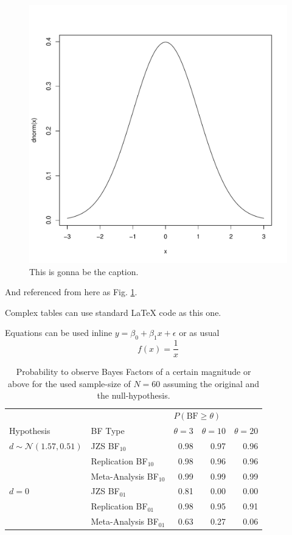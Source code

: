 \documentclass[fleqn,10pt]{wlscirep}
\begin{document}
\begin{figure}
\centering
\includegraphics{pics/dummy.pdf}
\caption{This is gonna be the caption.\label{fig:dummy}}
\end{figure}

And referenced from here as Fig. \ref{fig:dummy}.

Complex tables can use standard LaTeX code as this one.

Equations can be used inline \(y=\beta_0 + \beta_1 x + \epsilon\) or as
usual \[f(x)=\frac{1}{x}\]

\begin{table}[ht]
\centering
\caption{Probability to observe Bayes Factors of a certain magnitude or above for the used sample-size of $N=60$ assuming the original and the null-hypothesis.}
\begin{tabular}{llrrr}
  & & \multicolumn{3}{l}{$P(\text{BF}\ge\theta)$}\\
  Hypothesis & BF Type & $\theta=3$ & $\theta=10$ & $\theta=20$ \\
  \hline
  $d\sim \mathcal{N}(1.57, 0.51)$ & JZS BF$_{10}$ & 0.98 & 0.97 & 0.96 \\
     & Replication BF$_{10}$ & 0.98 & 0.96 & 0.96 \\
     & Meta-Analysis BF$_{10}$ & 0.99 & 0.99 & 0.99 \\\cline{2-5}
    $d=0$ & JZS BF$_{01}$ & 0.81 & 0.00 & 0.00 \\
   & Replication BF$_{01}$ & 0.98 & 0.95 & 0.91 \\
     & Meta-Analysis BF$_{01}$ & 0.63 & 0.27 & 0.06 \\
   \hline
\end{tabular}
\label{tab:probbf}
\end{table}
\end{document}

